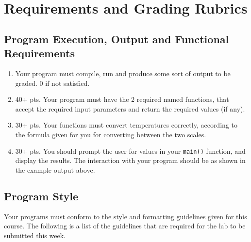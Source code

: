 \documentclass[11pt]{article}
\begin{document}
\section*{Requirements and Grading Rubrics}
\label{sec-5}
\subsection*{Program Execution, Output and Functional Requirements}
\label{sec-5-1}


\begin{enumerate}
\item Your program must compile, run and produce some sort of output to be
  graded. 0 if not satisfied.
\item 40+ pts.  Your program must have the 2 required named functions, that 
   accept the required input parameters and return the required values
   (if any).
\item 30+ pts. Your functions must convert temperatures correctly, according to the
   formula given for you for converting between the two scales.
\item 30+ pts. You should prompt the user for values in your \verb~main()~ function, and
   display the results.  The interaction with your program should be as shown
   in the example output above.
\end{enumerate}
\subsection*{Program Style}
\label{sec-5-2}


Your programs must conform to the style and formatting guidelines given for this course.
The following is a list of the guidelines that are required for the lab to be submitted
this week.
\end{document}
